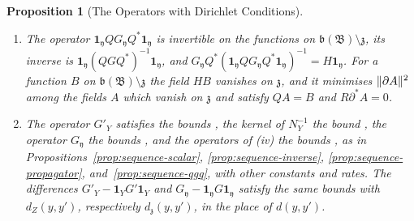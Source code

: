 \documentclass[11pt]{preprint}
\DeclarePairedDelimiter{\norm}{\lVert}{\rVert}
\numberwithin{equation}{section}
\newtheorem{proposition}[theorem]{Proposition}
\theoremstyle{definition}
\theoremstyle{remark}
\theoremstyle{plain}
\begin{document}
\begin{proposition}[The Operators with Dirichlet Conditions]
\begin{enumerate}[label=(\roman*)]
\item The operator $\mathbf 1_{\mathfrak y}QG_{\mathfrak y}Q^*\mathbf 1_{\mathfrak y}$ is invertible on the functions on $\mathfrak b(\mathfrak B) \setminus \mathfrak z$, its inverse is $\mathbf 1_{\mathfrak y}(QGQ^*)^{-1}\mathbf 1_{\mathfrak y}$, and $G_{\mathfrak y}Q^*(\mathbf 1_{\mathfrak y}QG_{\mathfrak y}Q^*\mathbf 1_{\mathfrak y})^{-1} = H\mathbf 1_{\mathfrak y}$. For a function $B$ on $\mathfrak b(\mathfrak B) \setminus \mathfrak z$ the field $HB$ vanishes on $\mathfrak z$, and it minimises $\norm{\partial A}^2$ among the fields $A$ which vanish on $\mathfrak z$ and satisfy $QA = B$ and $R\partial^*A = 0$.
\item The operator $G'_Y$ satisfies the bounds \cite[(2.67)]{BalabanPRT2}, the kernel of $N_Y^{-1}$ the bound \cite[(2.87)]{BalabanPRT2}, the operator $G_{\mathfrak y}$ the bounds \cite[(2.136)--(2.140)]{BalabanPRT2}, and the operators of (iv) the bounds \cite[(2.149), (2.151)]{BalabanPRT2}, as in Propositions~\ref{prop:sequence-scalar}, \ref{prop:sequence-inverse}, \ref{prop:sequence-propagator}, and~\ref{prop:sequence-qgq}, with other constants and rates. The differences $G'_Y - \mathbf 1_YG'\mathbf 1_Y$ and $G_{\mathfrak y} - \mathbf 1_{\mathfrak y}G\mathbf 1_{\mathfrak y}$ satisfy the same bounds with $d_Z(y, y')$, respectively $d_{\mathfrak z}(y, y')$, in the place of $d(y, y')$.
\end{enumerate}
\end{proposition}
\end{document}
